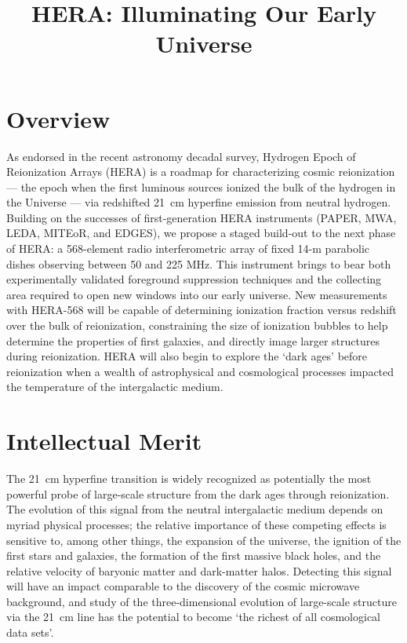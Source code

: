 \documentclass[preprint]{aastex}
\begin{document}
\pagestyle{empty}

\title{HERA: Illuminating Our Early Universe}

\section*{Overview}

As endorsed in the recent astronomy decadal survey, Hydrogen Epoch of Reionization Arrays (HERA) is a roadmap for characterizing
cosmic reionization --- the epoch when the first luminous sources ionized the
bulk of the hydrogen in the Universe --- via redshifted 21~cm hyperfine
emission from neutral hydrogen.  Building on the successes of first-generation
HERA instruments (PAPER, MWA, LEDA, MITEoR, and EDGES), we propose a staged
build-out to the next phase of HERA: a 568-element radio interferometric array
of fixed 14-m parabolic dishes observing between 50 and 225 MHz.  This
instrument brings to bear both experimentally validated
foreground suppression techniques and the collecting area required to open new windows into our early
universe.  New measurements with HERA-568 will be capable of determining
ionization fraction versus redshift over the bulk of reionization,
constraining the size of ionization bubbles to help determine the properties of
first galaxies, and directly image larger structures during
reionization.  HERA will also begin to explore the `dark ages' before 
reionization when a wealth of astrophysical and cosmological processes
impacted the temperature of the intergalactic medium.

\section*{Intellectual Merit}

The 21~cm hyperfine transition is widely recognized as potentially the most
powerful probe of large-scale structure from the dark ages through
reionization.  The evolution of this signal from the neutral intergalactic
medium depends on myriad physical processes; the relative importance of
these competing effects is sensitive to, among other things, the expansion of
the universe, the ignition of the first stars and galaxies, the formation of
the first massive black holes, and the relative
velocity of baryonic matter and dark-matter halos.
Detecting this signal will have an impact
comparable to the discovery of the cosmic microwave background, and study of the three-dimensional
evolution of large-scale structure via the 21~cm line has the
potential to become `the richest of all cosmological data sets'.
\end{document}
